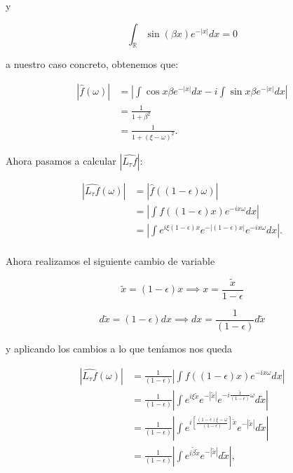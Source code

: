 \begin{observacion}
  \noindent y 

  \begin{equation}\label{eq:res_auxiliar_2}
    \int_\mathbb{R} \sin(\beta x) e^{-|x|} dx= 0
  \end{equation}

  \noindent a nuestro caso concreto, obtenemos que: 

  \begin{align*}
    |\widehat{f}(\omega)|&=\left|  \int{\cos{x\beta}e^{-|x|} dx} - i \int{\sin{x\beta}e^{-|x|} dx} \right| \\
    &=\frac{1}{1+\beta^2} \\
    &=\frac{1}{1+(\xi - \omega)^2}.
  \end{align*} 

  \noindent Ahora pasamos a calcular $|\widehat{L_\tau f}|$:

  \begin{align*}
    |\widehat{L_\tau f}(\omega)| &= |\widehat{f}((1-\epsilon)\omega)| \\
    &=\left|  \int{f((1-\epsilon)x)e^{-ix\omega}dx}  \right | \\
    &=\left|  \int{e^{i \xi (1-\epsilon) x}e^{-|(1-\epsilon)x|}e^{-ix\omega}dx}  \right |. \\
  \end{align*}

  \noindent Ahora realizamos el siguiente cambio de variable

  \begin{equation}
    \tilde{x}=(1-\epsilon) x \implies x=\frac{\tilde{x}}{1-\epsilon} 
  \end{equation}

  \begin{equation}
  d\tilde{x}=(1-\epsilon) dx \implies dx=\frac{1}{(1-\epsilon)}d\tilde{x}
  \end{equation}

  \noindent y aplicando los cambios a lo que teníamos nos queda

  \begin{align*}
    |\widehat{L_\tau f}(\omega)| 
    &= \frac{1}{(1-\epsilon)}\left|  \int{f((1-\epsilon)x)e^{-ix\omega}dx}  \right | \\
    &=\frac{1}{(1-\epsilon)}\left|  \int{e^{i \xi \tilde{x}}e^{-|\tilde{x}|}e^{-i\frac{\tilde{x}}{(1-\epsilon)}\omega}d\tilde{x}}  \right | \\
    &=\frac{1}{(1-\epsilon)}\left|  \int{e^{i \left[ \frac{(1-\epsilon) \xi - \omega}{(1-\epsilon)}\right]\tilde{x}}e^{-|\tilde{x}|} d\tilde{x}}  \right | \\
    &=\frac{1}{(1-\epsilon)}\left|  \int{e^{i \tilde{\beta}\tilde{x}}e^{-|\tilde{x}|} d\tilde{x}}  \right |, \\
  \end{align*}


\end{observacion}
